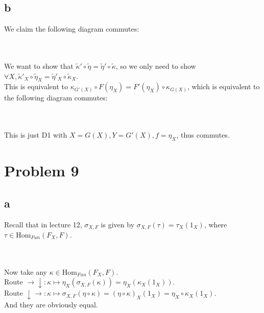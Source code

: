 \documentclass{article}
\newcommand{\Hom}{\text{Hom}}
\begin{document}
\subsection{b}

We claim the following diagram commutes:\\

\\ \\
We want to show that $\widetilde{\kappa}'\circ\widetilde{\eta}=\widetilde{\eta}'\circ \widetilde{\kappa}$, so we only need to show $\forall X,\widetilde{\kappa}'_X\circ \widetilde{\eta}_X=\widetilde{\eta}'_X\circ \widetilde{\kappa}_X$.\\
This is equivalent to $\kappa_{G'(X)}\circ F(\eta_X)=F'(\eta_X)\circ \kappa_{G(X)}$, which is equivalent to the following diagram commutes:\\

\\ \\
This is just D1 with $X=G(X),Y=G'(X),f=\eta_X$, thus commutes.

\section{Problem 9}

\subsection{a}

Recall that in lecture 12, $\sigma_{X,F}$ is given by $\sigma_{X,F}(\tau)=\tau_X(1_X)$, where $\tau\in \Hom_{Fun}(F_X,F)$.\\

\\ \\
Now take any $\kappa\in \Hom_{Fun}(F_X,F)$.\\
Route $\rightarrow\downarrow:\kappa\mapsto\eta_X(\sigma_{X,F}(\kappa))=\eta_X(\kappa_X(1_X))$.\\
Route $\downarrow\rightarrow:\kappa\mapsto \sigma_{X,F}(\eta\circ \kappa)=(\eta\circ \kappa)_X(1_X)=\eta_X\circ \kappa_X(1_X)$.\\
And they are obviously equal.
\end{document}
